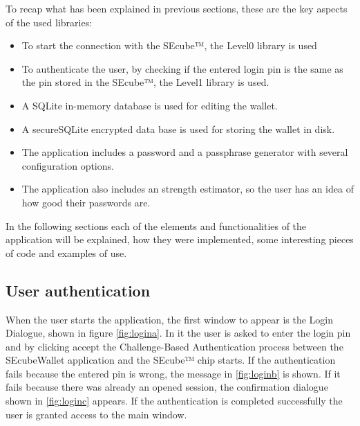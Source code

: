 
To recap what has been explained in previous sections, these are the key aspects of the used libraries:

\begin{itemize}
\setlength\itemsep{0pt}

\item To start the connection with the SEcube™, the Level0 library is used
\item To authenticate the user, by checking if the entered login pin is the same as the pin stored in the SEcube™, the Level1 library is used.
\item A SQLite in-memory database is used for editing the wallet.
\item A secureSQLite encrypted data base is used for storing the wallet in disk.
\item The application includes a password and a passphrase generator with several configuration options.
\item The application also includes an strength estimator, so the user has an idea of how good their passwords are.

\end{itemize}

In the following sections each of the elements and functionalities of the application will be explained, how they were implemented, some interesting pieces of code and examples of use.

\subsection{User authentication}

When the user starts the application, the first window to appear is the Login Dialogue, shown in figure \ref{fig:logina}. In it the user is asked to enter the login pin and by clicking accept the Challenge-Based Authentication process between the SEcubeWallet application and the SEcube™ chip starts. If the authentication fails because the entered pin is wrong, the message in \ref{fig:loginb} is shown. If it fails because there was already an opened session, the confirmation dialogue shown in \ref{fig:loginc} appears. If the authentication is completed successfully the user is granted access to the main window.

